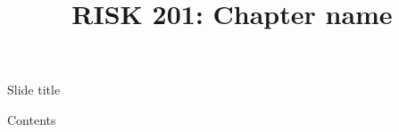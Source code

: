 \documentclass{beamer}
\title{RISK 201: Chapter name}
\begin{document}
\maketitle

\begin{frame}{Slide title}

Contents

\end{frame}
\end{document}
